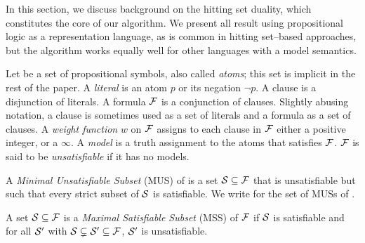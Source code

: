 
In this section, we discuss background on the hitting set duality, which constitutes the core of our algorithm. 
We present all result using propositional logic  as a representation language, as is common in hitting set--based approaches, but the algorithm works equally well for other languages with a model semantics. 
 
%  
% 
% 

\newcommand\F{\formula}
Let \voc be a set of propositional symbols, also called \emph{atoms}; this set is implicit in the rest of the paper. A \emph{literal} is an atom $p$ or its negation $\lnot p$. A clause is a disjunction of literals. A formula $\mathcal{F} $ is a conjunction of clauses. 
Slightly abusing notation, a clause is sometimes used as a set of literals and a formula as a set of clauses.
A \emph{weight function} $w$ on $\mathcal{F} $ assigns to each clause in $\mathcal{F} $ either a positive integer, or a $\infty$. 
A \emph{model} is a truth assignment
 to the atoms that satisfies $\mathcal{F} $.
$\mathcal{F} $ is said to be \emph{unsatisfiable} if it has no models. 

\begin{definition}
  A \emph{Minimal Unsatisfiable Subset} (MUS) of \F is a set $\m{S} \subseteq \F$  that is unsatisfiable but such that every strict subset of $\mathcal{S} $ is satisfiable. 
%   
  We write \muses{\F} for the set of MUSs of \F. 
\end{definition}



\begin{definition}
    A set $\mathcal{S} \subseteq \mathcal{F} $ is a \emph{Maximal Satisfiable Subset} (MSS) of $ \mathcal{F} $ if $\mathcal{S}$ is satisfiable and for all $\mathcal{S}'$ with $\mathcal{S}  \subsetneq  \mathcal{S}'\subseteq\mathcal{F}  $, $\mathcal{S}'$ is unsatisfiable.
\end{definition}

